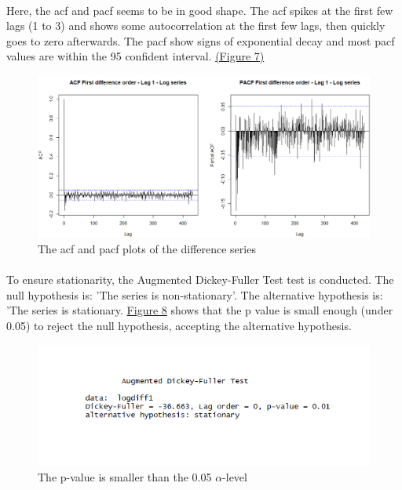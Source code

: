 \documentclass[12pt]{article}
\begin{document}
\paragraph{}
Here, the acf and pacf seems to be in good shape. The acf spikes at the first few lags (1 to 3)  and shows some autocorrelation at the first few lags, then quickly goes to zero afterwards. The pacf show signs of exponential decay and most pacf values are within the 95 confident interval. \href{figure7}{(Figure 7)}
\begin{figure}[H]
  \includegraphics[width=\linewidth]{figure7.png}
  \caption{The acf and pacf plots of the difference series}
  \label{fig:figure7}
\end{figure}

\paragraph{}
To ensure stationarity, the Augmented Dickey-Fuller Test test is conducted. The null hypothesis is: 'The series is non-stationary'. The alternative hypothesis is: 'The series is stationary. \href{figure8}{Figure 8} shows that the p value is small enough (under 0.05) to reject the null hypothesis, accepting the alternative hypothesis. 
\begin{figure}[H]
  \includegraphics[width=\linewidth]{figure8.png}
  \caption{The p-value is smaller than the 0.05 $\alpha$-level }
  \label{fig:figure8}
\end{figure}
\end{document}
